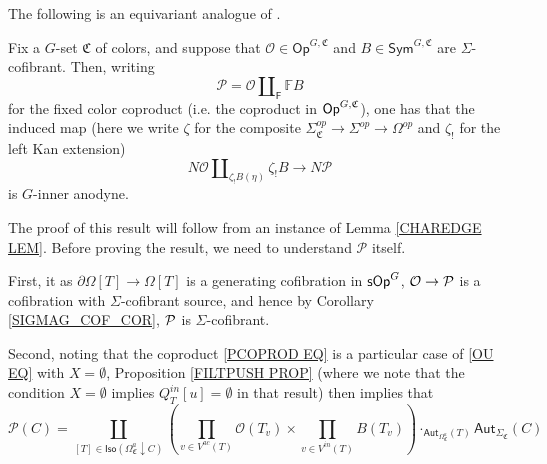 \documentclass[a4paper,10pt
,draft
]{article}%
\renewcommand{\1}{\eta}%
\begin{document}
The following is an equivariant analogue of \cite[Prop. 3.2]{CM13b}.

\begin{proposition}\label{KEYPR PROP}
Fix a $G$-set $\mathfrak{C}$ of colors,
and suppose that 
$\mathcal{O} \in \mathsf{Op}^{G,\mathfrak{C}}$
and
$B \in \mathsf{Sym}^{G,\mathfrak{C}}$
are
$\Sigma$-cofibrant.
Then, writing
\begin{equation}\label{PCOPROD EQ}
\mathcal{P} = \mathcal{O} \amalg_{\mathsf{F}} \mathbb{F} B
\end{equation}
for the fixed color coproduct (i.e. the coproduct in $\Op^{G, \mathfrak C}$),
one has that the induced map
(here we write $\zeta$ for the composite
$\Sigma_{\mathfrak{C}}^{op} \to \Sigma^{op} \to \Omega^{op}$
and $\zeta_!$ for the left Kan extension)
\begin{equation}\label{ANODYNEMAP EQ}
N \mathcal{O} \amalg_{\zeta_!B (\eta)} \zeta_!B \to N \mathcal{P}
\end{equation}
is $G$-inner anodyne.
%
\end{proposition}


The proof of this result will follow from an instance of 
Lemma \ref{CHAREDGE LEM}. 
Before proving the result, we need to understand $\mathcal{P}$ itself.

First, it as $\partial \Omega[T] \to \Omega[T]$ is a generating cofibration in $\sOp^G$,
$\O \to \P$ is a cofibration with $\Sigma$-cofibrant source, and hence by Corollary \ref{SIGMAG_COF_COR},
$\P$ is $\Sigma$-cofibrant.

Second, noting that the coproduct \eqref{PCOPROD EQ}
is a particular case of \eqref{OU EQ} with $X=\emptyset$,
Proposition \ref{FILTPUSH PROP}
(where we note that the condition $X=\emptyset$ implies
$Q^{in}_T[u] = \emptyset$ in that result)
then implies that  
\begin{equation}\label{PUSHOPPR EQ}
	\mathcal{P}(C) = 
	\coprod_{
	[T] \in \mathsf{Iso}
	\left( \Omega_{\mathfrak{C}}^a \downarrow C \right)
	}
	\left(
		\prod_{v \in V^{ac}(T)} \mathcal{O}(T_v)
	\times
		\prod_{v \in V^{in}(T)} B(T_v)
	\right)
	\cdot_{\mathsf{Aut}_{\Omega^a_{\mathfrak{C}}}(T)} \mathsf{Aut}_{\Sigma_{\mathfrak{C}}}(C)
\end{equation}
\end{document}
